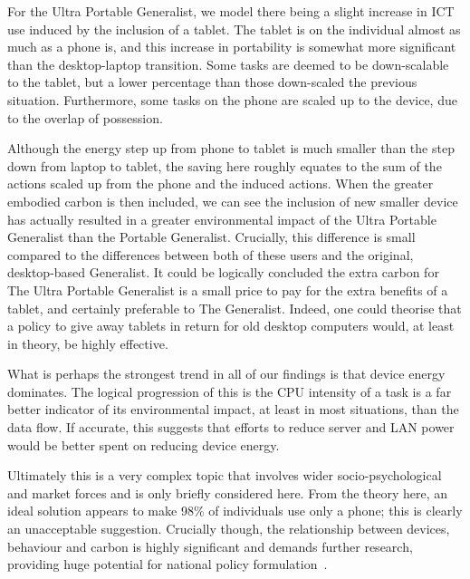 \documentclass[conference]{IEEEtran}
\begin{document}

For the Ultra Portable Generalist, we model there being a slight
increase in ICT use induced by the inclusion of a tablet. The tablet is
on the individual almost as much as a phone is, and this increase in
portability is somewhat more significant than the desktop-laptop
transition. Some tasks are deemed to be down-scalable to the tablet,
but a lower percentage than those down-scaled the previous
situation. Furthermore, some tasks on the phone are scaled up to the
device, due to the overlap of possession.

Although the energy step up from phone to tablet is much smaller than
the step down from laptop to tablet, the saving here roughly equates
to the sum of the actions scaled up from the phone and the induced
actions. When the greater embodied carbon is then included, we can see
the inclusion of new smaller device has actually resulted in a greater
environmental impact of the Ultra Portable Generalist than the
Portable Generalist. Crucially, this difference is small compared to
the differences between both of these users and the original,
desktop-based Generalist. It could be logically concluded the extra
carbon for The Ultra Portable Generalist is a small price to pay for
the extra benefits of a tablet, and certainly preferable to The
Generalist. Indeed, one could theorise that a policy to give away
tablets in return for old desktop computers would, at least in theory,
be highly effective.


What is perhaps the strongest trend in all of our findings is that
device energy dominates. The logical progression of this is the CPU
intensity of a task is a far better indicator of its environmental
impact, at least in most situations, than the data flow. If accurate,
this suggests that efforts to reduce server and LAN power would be
better spent on reducing device energy.

Ultimately this is a very complex topic that involves wider
socio-psychological and market forces and is only briefly considered
here. From the theory here, an ideal solution appears to make 98\% of
individuals use only a phone; this is clearly an unacceptable
suggestion. Crucially though, the relationship between devices,
behaviour and carbon is highly significant and demands further
research, providing huge potential for national policy
formulation~\cite{smart2020:2008,ruth:2011}.
\end{document}
